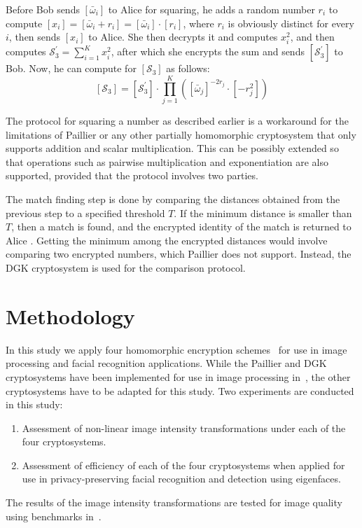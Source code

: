 Before Bob sends $\left[\bar{\omega}_i\right]$ to Alice for squaring, he adds a random number $r_i$ to compute $\left[x_i\right] = \left[\bar{\omega}_i + r_i\right] = \left[\bar{\omega}_i\right] \cdot \left[r_i\right]$, where $r_i$ is obviously distinct for every $i$, then sends $\left[x_i\right]$ to Alice. She then decrypts it and computes $x_i^2$, and then computes $\mathcal{S}_3^\prime = \sum_{i=1}^{K} x_i^2$, after which she encrypts the sum and sends $\left[\mathcal{S}_3^\prime\right]$ to Bob. Now, he can compute for $\left[\mathcal{S}_3\right]$ as follows:
\begin{equation}
	\left[\mathcal{S}_3\right] = \left[\mathcal{S}_3^\prime\right] \cdot \prod_{j=1}^{K} \left(\left[\bar{\omega}_j\right]^{-2r_j} \cdot \left[-r_j^2\right]\right)
\end{equation}

The protocol for squaring a number as described earlier is a workaround for the limitations of Paillier or any other partially homomorphic cryptosystem that only supports addition and scalar multiplication. This can be possibly extended so that operations such as pairwise multiplication and exponentiation are also supported, provided that the protocol involves two parties.

The match finding step is done by comparing the distances obtained from the previous step to a specified threshold $T$. If the minimum distance is smaller than $T$, then a match is found, and the encrypted identity of the match is returned to Alice \cite{hutchison_privacy-preserving_2009}. Getting the minimum among the encrypted distances would involve comparing two encrypted numbers, which Paillier does not support. Instead, the DGK cryptosystem \cite{pieprzyk_efficient_2007} is used for the comparison protocol.







\section{Methodology}
In this study we apply four homomorphic encryption schemes~\cite{ziad_cryptoimg:_2016, pieprzyk_efficient_2007, dasgupta_design_2016, garay_algorithms_2014} for use in image processing and facial recognition applications.
While the Paillier and DGK cryptosystems have been implemented for use in image processing in~\cite{ziad_cryptoimg:_2016, hutchison_privacy-preserving_2009}, the other cryptosystems have to be adapted for this study.
Two experiments are conducted in this study:
\begin{enumerate}
	\item Assessment of non-linear image intensity transformations under each of the four cryptosystems.
	\item Assessment of efficiency of each of the four cryptosystems when applied for use in privacy-preserving facial recognition and detection using eigenfaces.
\end{enumerate}
The results of the image intensity transformations are tested for image quality using benchmarks in~\cite{ahmed_benchmark_2016}.

